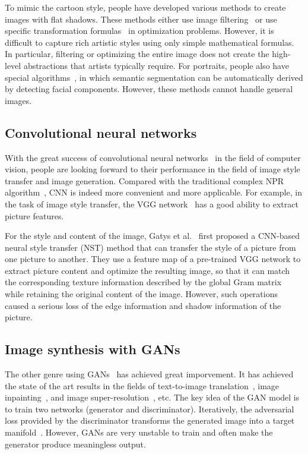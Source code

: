 \documentclass[10pt,twocolumn,letterpaper]{article}
\begin{document}
To mimic the cartoon style, people have developed various methods to create
images with flat shadows. These methods either use image filtering~\cite{winnemoller2006real} or use specific
transformation formulas~\cite{xu2011image} in optimization problems. However, it is difficult to
capture rich artistic styles using only simple mathematical formulas. In
particular, filtering or optimizing the entire image does not create the
high-level abstractions that artists typically require. For portraits, people
also have special algorithms~\cite{yang2010semantics, rosin2015non}, in which semantic segmentation can be automatically
derived by detecting facial components. However, these methods cannot handle general images.

\subsection{Convolutional neural networks}
With the great success of convolutional neural networks~\cite{krizhevsky2012imagenet, lawrence1997face} in the field of
computer vision, people are looking forward to their performance in the
field of image style transfer and image generation. Compared with the
traditional complex NPR algorithm~\cite{saito1990comprehensible,luque2012cel}, CNN is indeed more convenient and more
applicable. For example, in the task of image style transfer, the VGG
network~\cite{VGG} has a good ability to extract picture features.

For the style and content of the image, Gatys et al.~\cite{NST} first proposed a
CNN-based neural style transfer (NST) method that can transfer the style
of a picture from one picture to another. They use a feature map of a
pre-trained VGG network to extract picture content and optimize the
resulting image, so that it can match the corresponding texture information
described by the global Gram matrix~\cite{gatys2015texture} while retaining the original content
of the image. However, such operations caused a serious loss of the edge
information and shadow information of the picture.

\subsection{Image synthesis with GANs}
The other genre using GANs~\cite{GAN} has achieved great imporvement. It has achieved
the state of the art results in the fields of text-to-image translation~\cite{reed2016generative}, image
inpainting~\cite{yeh2016semantic}, and image super-resolution~\cite{ledig2017photo}, etc. The key idea of the GAN model
is to train two networks (generator and discriminator). Iteratively,
the adversarial loss provided by the discriminator transforms the
generated image into a target manifold~\cite{yeh2016semantic}. However, GANs are very unstable to train and
often make the generator produce meaningless output.
\end{document}
